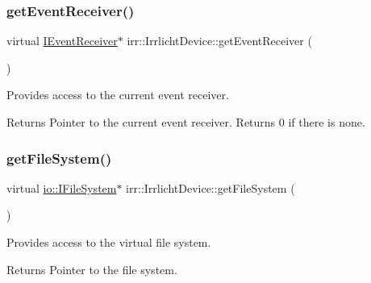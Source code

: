 \subsubsection{\texorpdfstring{get\+Event\+Receiver()}{getEventReceiver()}\hspace{0.1cm}{\footnotesize\ttfamily [3/3]}}
{\footnotesize\ttfamily virtual \hyperlink{classirr_1_1IEventReceiver}{I\+Event\+Receiver}$\ast$ irr\+::\+Irrlicht\+Device\+::get\+Event\+Receiver (\begin{DoxyParamCaption}{ }\end{DoxyParamCaption})\hspace{0.3cm}{\ttfamily [pure virtual]}}



Provides access to the current event receiver. 

\begin{DoxyReturn}{Returns}
Pointer to the current event receiver. Returns 0 if there is none. 
\end{DoxyReturn}
\mbox{\label{classirr_1_1IrrlichtDevice_a3d8d2dee2f57aa7e6c0d14592de3e6ed}} 
\subsubsection{\texorpdfstring{get\+File\+System()}{getFileSystem()}\hspace{0.1cm}{\footnotesize\ttfamily [1/3]}}
{\footnotesize\ttfamily virtual \hyperlink{classirr_1_1io_1_1IFileSystem}{io\+::\+I\+File\+System}$\ast$ irr\+::\+Irrlicht\+Device\+::get\+File\+System (\begin{DoxyParamCaption}{ }\end{DoxyParamCaption})\hspace{0.3cm}{\ttfamily [pure virtual]}}



Provides access to the virtual file system. 

\begin{DoxyReturn}{Returns}
Pointer to the file system. 
\end{DoxyReturn}
\mbox{\label{classirr_1_1IrrlichtDevice_a3d8d2dee2f57aa7e6c0d14592de3e6ed}} 
